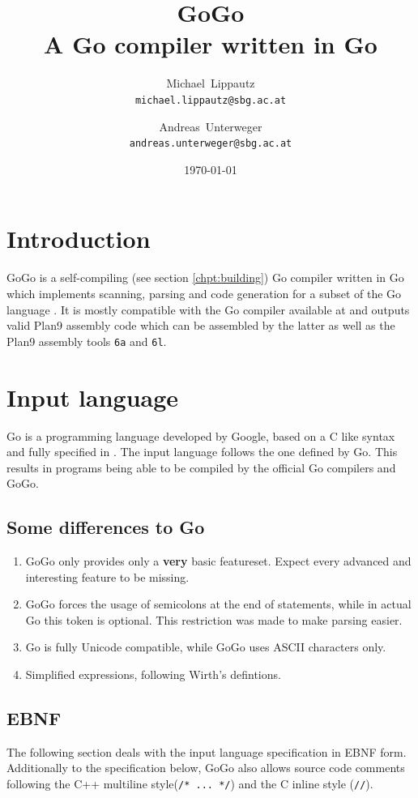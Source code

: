 \documentclass[a4paper]{scrartcl}
\title{GoGo\\ \large{A Go compiler written in Go}}
\author{
  Michael~Lippautz \\ \normalsize{\texttt{michael.lippautz@sbg.ac.at}} 
    \and 
  Andreas~Unterweger \\ \normalsize{\texttt{andreas.unterweger@sbg.ac.at}} 
}
\date{\today}
\let\chapter\section
\let\section\subsection
\let\subsection\subsubsection
\let\subsubsection\paragraph
\let\paragraph\subparagraph
\let\subparagraph\undefined
\begin{document}
  \maketitle
  \tableofcontents

  \chapter{Introduction}
    GoGo is a self-compiling (see section \ref{chpt:building}) Go compiler 
    written in Go which implements scanning, parsing and code generation for a 
    subset of the Go language \cite{goo10}. It is mostly compatible with the Go 
    compiler available at \cite{goo10} and outputs valid Plan9 assembly code 
    which can be assembled by the latter as well as the Plan9 assembly tools 
    \texttt{6a} and \texttt{6l}\cite{pik00}.\\


  \chapter{Input language}
    Go is a programming language developed by Google, based on a C like syntax and fully specified in \cite{goo10}. The input language follows the one defined by Go. This results in programs being able to be compiled by the official Go compilers and GoGo.

    \section{Some differences to Go}
      \begin{enumerate}
        \item GoGo only provides only a \textbf{very} basic featureset. Expect 
          every advanced and interesting feature to be missing.
        \item GoGo forces the usage of semicolons at the end of statements, 
          while in actual Go this token is optional. This restriction was made 
          to make parsing easier.
        \item Go is fully Unicode compatible, while GoGo uses ASCII characters only.
        \item Simplified expressions, following Wirth's defintions\cite{wir96}.
      \end{enumerate}

    \section{EBNF}
    \label{sec:ebnf}
      The following section deals with the input language specification in 
      EBNF form. Additionally to the specification below, GoGo also allows 
      source code comments following the C++ multiline style(\texttt{/* ... */}) 
      and the C inline style (\texttt{//}).
\end{document}
